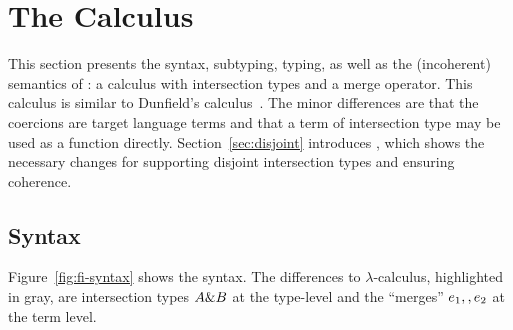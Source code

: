 \section{The \name Calculus}
\label{sec:fi}


This section presents the syntax, subtyping, typing, as well as the (incoherent)
semantics of \name: a calculus with intersection types and a merge operator.
This calculus is similar to Dunfield's calculus~\cite{dunfield2014elaborating}.
The minor differences are that the coercions are target language terms and that
a term of intersection type may be used as a function directly. Section~\ref{sec:disjoint} introduces \name, which shows the
necessary changes for supporting disjoint intersection types and ensuring
coherence.

\subsection{Syntax}

Figure~\ref{fig:fi-syntax} shows the syntax. The differences to
$\lambda$-calculus, highlighted in gray, are intersection types $A \& B$ at
the type-level and the ``merges'' $e_1 ,, e_2$ at the term level.

